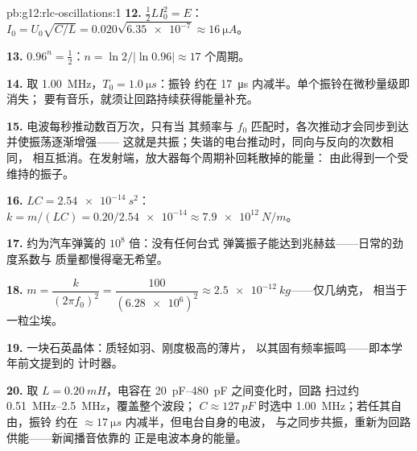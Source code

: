 \begin{solution}{pb:g12:rlc-oscillations:1}
\textbf{12.} $\tfrac12 LI_0^2 = E$：$I_0 = U_0\sqrt{C/L} =
0.020\sqrt{\num{6.35e-7}} \approx \qty{16}{\micro A}$。

\textbf{13.} $0.96^n = \tfrac12$：$n = \ln 2/\lvert\ln 0.96\rvert
\approx 17$ 个周期。

\textbf{14.} 取 \qty{1.00}{MHz}，$T_0 = \qty{1.0}{\micro s}$：振铃
约在 \qty{17}{\micro s} 内减半。单个振铃在微秒量级即消失；
要有音乐，就须让回路持续获得能量补充。

\textbf{15.} 电波每秒推动数百万次，只有当
其频率与 $f_0$ 匹配时，各次推动才会同步到达并使振荡逐渐增强——
这就是共振；失谐的电台推动时，同向与反向的次数相同，
相互抵消。在发射端，放大器每个周期补回耗散掉的能量：
由此得到一个受维持的振子。

\textbf{16.} $LC = \qty{2.54e-14}{s^2}$：$k = m/(LC) =
0.20/\num{2.54e-14} \approx \qty{7.9e12}{N/m}$。

\textbf{17.} 约为汽车弹簧的 $10^8$ 倍：没有任何台式
弹簧振子能达到兆赫兹——日常的劲度系数与
质量都慢得毫无希望。

\textbf{18.} $m = \dfrac{k}{(2\pi f_0)^2} = \dfrac{100}
{(\num{6.28e6})^2} \approx \qty{2.5e-12}{kg}$——仅几纳克，
相当于一粒尘埃。

\textbf{19.} 一块石英晶体：质轻如羽、刚度极高的薄片，
以其固有频率振鸣——即本学年前文提到的
计时器。

\textbf{20.} 取 $L = \qty{0.20}{mH}$，电容在 \qtyrange{20}{480}{pF} 之间变化时，回路
扫过约 \qtyrange{0.51}{2.5}{MHz}，覆盖整个波段；
$C \approx \qty{127}{pF}$ 时选中 \qty{1.00}{MHz}；若任其自由，振铃
约在 $\approx \qty{17}{\micro s}$ 内减半，但电台自身的电波，
与之同步共振，重新为回路供能——新闻播音依靠的
正是电波本身的能量。
\end{solution}
